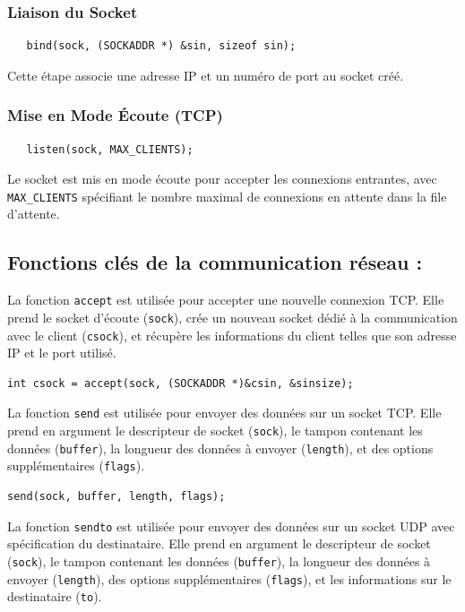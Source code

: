 \documentclass{article}
\begin{document}
\subsubsection*{Liaison du Socket}

\begin{verbatim}
   bind(sock, (SOCKADDR *) &sin, sizeof sin);
\end{verbatim}

Cette étape associe une adresse IP et un numéro de port au socket créé.

\subsubsection*{Mise en Mode Écoute (TCP)}

\begin{verbatim}
   listen(sock, MAX_CLIENTS);
\end{verbatim}

Le socket est mis en mode écoute pour accepter les connexions entrantes, avec \texttt{MAX_CLIENTS} spécifiant le nombre maximal de connexions en attente dans la file d'attente.

\subsection{Fonctions clés de la communication réseau : }


La fonction \texttt{accept} est utilisée pour accepter une nouvelle connexion TCP. Elle prend le socket d'écoute (\texttt{sock}), crée un nouveau socket dédié à la communication avec le client (\texttt{csock}), et récupère les informations du client telles que son adresse IP et le port utilisé.

\begin{verbatim}
int csock = accept(sock, (SOCKADDR *)&csin, &sinsize);
\end{verbatim}

La fonction \texttt{send} est utilisée pour envoyer des données sur un socket TCP. Elle prend en argument le descripteur de socket (\texttt{sock}), le tampon contenant les données (\texttt{buffer}), la longueur des données à envoyer (\texttt{length}), et des options supplémentaires (\texttt{flags}).

\begin{verbatim}
send(sock, buffer, length, flags);
\end{verbatim}

La fonction \texttt{sendto} est utilisée pour envoyer des données sur un socket UDP avec spécification du destinataire. Elle prend en argument le descripteur de socket (\texttt{sock}), le tampon contenant les données (\texttt{buffer}), la longueur des données à envoyer (\texttt{length}), des options supplémentaires (\texttt{flags}), et les informations sur le destinataire (\texttt{to}).
\end{document}
